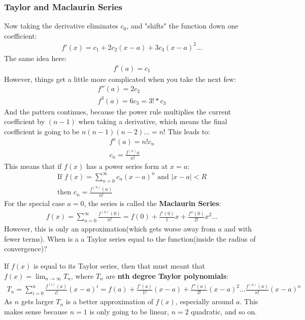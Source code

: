 \documentclass{article}
\begin{document}
\subsubsection{Taylor and Maclaurin Series}
Now taking the derivative eliminates $c_0$, and "shifts" the function down one coefficient:
\begin{gather*}
    f'(x) = c_1 + 2c_2(x-a) + 3c_3(x-a)^2...
\end{gather*}
The same idea here:
\begin{gather*}
    f'(a) = c_1
\end{gather*}
However, things get a little more complicated when you take the next few:
\begin{gather*}
    f''(a) = 2c_2\\
    f^3(a) = 6c_3 = 3! * c_3
\end{gather*}
And the pattern continues, because the power rule multiplies the current coefficient by $(n-1)$ when taking a derivative, which means the final coefficient is going to be $n(n-1)(n-2)... = n!$ This leads to:
\begin{gather*}
    f^n(a) = n! c_n\\
    c_n = \frac{f^{(n)}a}{n!}
\end{gather*}
This means that if $f(x)$ has a power series form at $x = a$:
\begin{gather*}
    \textrm{If } f(x) = \sum_{n=0}^\infty c_n(x-a)^n\textrm{ and }|x-a| < R\\
    \textrm{then }c_n = \frac{f^{(n)}(a)}{n!}
\end{gather*}
For the special case $a = 0$, the series is called the \textbf{Maclaurin Series}:
\begin{gather*}
    f(x) = \sum_{n=0}^\infty \frac{f^{(n)}(0)}{n!} = f(0) + \frac{f'(0)}{1}x + \frac{f''(0)}{2!}x^2...
\end{gather*}
However, this is only an approximation(which gets worse away from $a$ and with fewer terms). When is a a Taylor series equal to the function(inside the radius of convergence)?

If $f(x)$ is equal to its Taylor series, then that must meant that $f(x) = \lim_{n \to \infty} T_n$, where $T_n$ are \textbf{nth degree Taylor polynomials}:
\begin{gather*}
    T_n = \sum_{i = 0}^n \frac{f^{(i)}(a)}{i!}(x-a)^i = f(a) + \frac{f'(a)}{1!}(x-a) + \frac{f''(a)}{2!}(x-a)^2...\frac{f^{(n)}(a)}{n!}(x-a)^n
\end{gather*}
As $n$ gets larger $T_n$ is a better approximation of $f(x)$, especially around $a$. This makes sense because $n=1$ is only going to be linear, $n=2$ quadratic, and so on.
\end{document}
